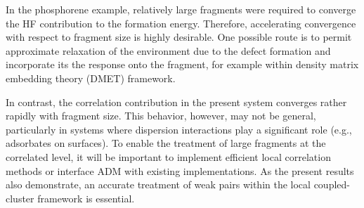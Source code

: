 \documentclass[aip,jcp,reprint]{revtex4-2}
\begin{document}
In the phosphorene example, relatively large fragments were required to converge the HF contribution to the formation energy. Therefore, accelerating convergence with respect to fragment size is highly desirable. One possible route is to permit approximate relaxation of the environment due to the defect formation and incorporate its the response onto the fragment, for example within density matrix embedding theory (DMET) framework.\cite{..}

In contrast, the correlation contribution in the present system converges rather rapidly with fragment size. This behavior, however, may not be general, particularly in systems where dispersion interactions play a significant role (e.g., adsorbates on surfaces). To enable the treatment of large fragments at the correlated level, it will be important to implement efficient local correlation methods or interface ADM with existing implementations.\cite{..} As the present results also demonstrate, an accurate treatment of weak pairs within the local coupled-cluster framework is essential.\cite{..}







\end{document}
